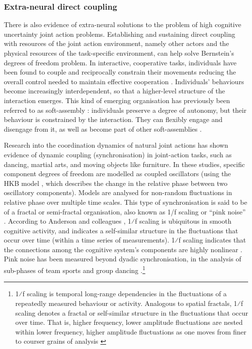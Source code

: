 \begin{CJK}{UTF8}{gbsn}
\subsubsection{Extra-neural direct coupling}
There is also evidence of extra-neural solutions to the problem of high cognitive uncertainty joint action problems. Establishing and sustaining direct coupling with resources of the joint action environment, namely other actors and the physical resources of the task-specific environment, can help solve Bernstein's degrees of freedom problem.   In interactive, cooperative tasks, individuals have been found to couple and reciprocally constrain their movements reducing the overall control needed to maintain effective cooperation \citep{Ramenzoni2011,Ramenzoni2012,Riley2011,Schmidt1990}.  Individuals’ behaviours become increasingly interdependent, so that a higher-level structure of the interaction emerges. This kind of emerging organisation has previously been referred to as soft-assembly \citep{Kello2009}: individuals preserve a degree of autonomy, but their behaviour is constrained by the interaction. They can flexibly engage and disengage from it, as well as become part of other soft-assemblies \citep{DeJaegher2010,DiPaolo2012}.

Research into the coordination dynamics of natural joint actions  has shown evidence of dynamic coupling (synchronisation) in joint-action tasks, such as dancing, martial arts, and moving objects like furniture.  In these studies, specific component degrees of freedom are modelled as coupled oscillators (using the HKB model \citep{Haken1985,Kelso1986}, which describes the change in the relative phase between two oscillatory components).  Models are analysed for non-random fluctuations in relative phase over multiple time scales.  This type of synchronisation is said to be of a fractal or semi-fractal organisation, also known as 1/f scaling or ``pink noise'' \citep{Caron2017}. According to Anderson and colleagues \citep{Anderson2012}, 1⁄f scaling is ubiquitous in smooth cognitive activity, and indicates a self-similar structure in the fluctuations that occur over time (within a time series of measurements).
1⁄f scaling indicates that the connections among the cognitive system's components are highly nonlinear \citep{Ding2002,Holden2013,Kello2010,Riley2011,VanOrden2003,VanOrden2005}. Pink noise has been measured beyond dyadic synchronisation, in the analysis of sub-phases of team sports \citep{Passos2014,Duarte2012} and group dancing \citep{Chauvigne2017}.\footnote{1⁄f scaling is temporal long-range dependencies in the fluctuations of a repeatedly measured behaviour or activity. Analogous to spatial fractals, 1⁄f scaling denotes a fractal or self-similar structure in the fluctuations that occur over time. That is, higher frequency, lower amplitude fluctuations are nested within lower frequency, higher amplitude fluctuations as one moves from finer to courser grains of analysis \cites(for a more detailed description see, for example)(){Holden2005}{Kello2009}}


\end{CJK}
